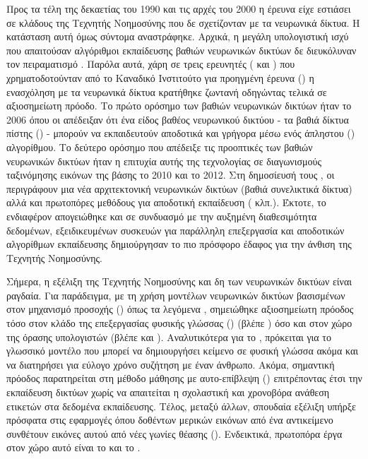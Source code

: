 Προς τα τέλη της δεκαετίας του 1990 και τις αρχές του 2000 η έρευνα είχε εστιάσει σε κλάδους της Τεχνητής Νοημοσύνης που δε σχετίζονταν με τα νευρωνικά δίκτυα. Η κατάσταση αυτή όμως σύντομα αναστράφηκε. Αρχικά, η μεγάλη υπολογιστική ισχύ που απαιτούσαν αλγόριθμοι εκπαί\-δευσης βαθιών νευρωνικών δικτύων δε διευκόλυναν τον πειραματισμό \cite{goodfellow2016deep}. Παρόλα αυτά, χάρη σε τρεις ερευνητές ( και ) που χρηματοδοτούνταν από το Καναδικό Ινστιτούτο για προηγμένη έρευνα () η ενασχόληση με τα νευρωνικά δίκτυα κρατήθηκε ζωντανή οδηγώντας τελικά σε αξιοσημείωτη πρόοδο. Το πρώτο ορόσημο των βαθιών νευρωνικών δικτύων ήταν το 2006 όπου οι  \cite{hinton2006fast} απέδειξαν ότι ένα είδος βαθέος νευρωνικού δικτύου - τα βαθιά δίκτυα πίστης () - μπορούν να εκπαιδευτούν αποδοτικά και γρήγορα μέσω ενός άπληστου () αλγορίθμου. Το δεύτερο ορόσημο που απέδειξε τις προοπτικές των βαθιών νευρωνικών δικτύων ήταν η επιτυχία αυτής της τεχνολογίας σε διαγωνισμούς ταξινόμησης εικόνων της βάσης  το 2010 και το 2012. Στη δημοσίευσή τους , οι  \cite{krizhevsky2012imagenet} περιγράφουν μια νέα αρχιτεκτονική νευρωνικών δικτύων (βαθιά συνελικτικά δίκτυα) αλλά και πρωτοπόρες μεθόδους για αποδοτική εκπαίδευση ( κλπ.). Έκτοτε, το ενδιαφέρον απογειώθηκε και σε συνδυασμό με την αυξημένη διαθεσιμότητα δεδομένων, εξειδικευμένων συσκευών για παράλληλη επεξεργασία και αποδοτικών αλγορίθμων εκπαίδευσης δημιούργησαν το πιο πρόσφορο έδαφος για την άνθιση της Τεχνητής Νοημοσύνης.
\par

Σήμερα, η εξέλιξη της Τεχνητής Νοημοσύνης και δη των νευρωνικών δικτύων είναι ραγ\-δαία. Για παράδειγμα, με τη χρήση μοντέλων νευρωνικών δικτύων βασισμένων στον μηχανισμό προσοχής () όπως τα λεγόμενα , σημειώθηκε αξιοσημείωτη πρόοδος τόσο στον κλάδο της επεξεργασίας φυσικής γλώσσας () (βλέπε ) όσο και στον χώρο της όρασης υπολογιστών (βλέπε  και ). Αναλυτικότερα για το , πρόκειται για το γλωσσικό μοντέλο που μπορεί να δημιουργήσει κείμενο σε φυσική γλώσσα ακόμα και να διατηρήσει για εύλογο χρόνο συζήτηση με έναν άνθρωπο. Ακόμα, σημαντική πρόοδος παρατηρείται στη μέθοδο μάθησης με αυτο-επίβλεψη () επιτρέποντας έτσι την εκπαίδευση δικτύων χωρίς να απαιτείται η σχολαστική και χρονοβόρα ανάθεση ετικετών στα δεδομένα εκπαίδευσης. Τέλος, μεταξύ άλλων, σπουδαία εξέλιξη υπήρξε πρόσφατα στις εφαρμογές όπου δοθέντων μερικών εικόνων από ένα αντικείμενο συνθέτουν εικόνες αυτού από νέες γωνίες θέασης (). Ενδεικτικά, πρωτοπόρα έργα στον χώρο αυτό είναι το  και το  \cite{benaich_hogarth_2021}. 
\par

